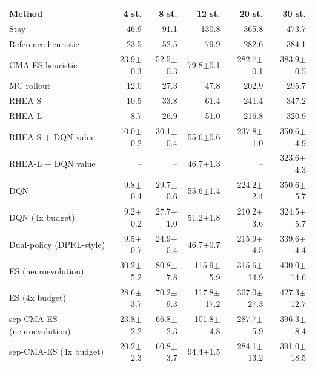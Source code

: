\begin{tabular}{lrrrrr}
\toprule
Method & 4 st. & 8 st. & 12 st. & 20 st. & 30 st. \\
\midrule
Stay & 46.9 & 91.1 & 130.8 & 365.8 & 473.7 \\
Reference heuristic & 23.5 & 52.5 & 79.9 & 282.6 & 384.1 \\
CMA-ES heuristic & 23.9$\pm$0.3 & 52.5$\pm$0.3 & 79.8$\pm$0.1 & 282.7$\pm$0.1 & 383.9$\pm$0.5 \\
MC rollout & 12.0 & 27.3 & 47.8 & 202.9 & 295.7 \\
RHEA-S & 10.5 & 33.8 & 61.4 & 241.4 & 347.2 \\
RHEA-L & 8.7 & 26.9 & 51.0 & 216.8 & 320.9 \\
RHEA-S + DQN value & 10.0$\pm$0.2 & 30.1$\pm$0.4 & 55.6$\pm$0.6 & 237.8$\pm$1.0 & 350.6$\pm$4.9 \\
RHEA-L + DQN value & -- & -- & 46.7$\pm$1.3 & -- & 323.6$\pm$4.3 \\
DQN & 9.8$\pm$0.4 & 29.7$\pm$0.6 & 55.6$\pm$1.4 & 224.2$\pm$2.4 & 350.6$\pm$5.7 \\
DQN (4x budget) & 9.2$\pm$0.2 & 27.7$\pm$1.0 & 51.2$\pm$1.8 & 210.2$\pm$3.6 & 324.5$\pm$5.7 \\
Dual-policy (DPRL-style) & 9.5$\pm$0.7 & 24.9$\pm$0.4 & 46.7$\pm$0.7 & 215.9$\pm$4.5 & 339.6$\pm$4.4 \\
ES (neuroevolution) & 30.2$\pm$5.2 & 80.8$\pm$7.8 & 115.9$\pm$5.9 & 315.6$\pm$14.9 & 430.0$\pm$14.6 \\
ES (4x budget) & 28.6$\pm$3.7 & 70.2$\pm$9.3 & 117.8$\pm$17.2 & 307.0$\pm$27.3 & 427.3$\pm$12.7 \\
sep-CMA-ES (neuroevolution) & 23.8$\pm$2.2 & 66.8$\pm$2.3 & 101.8$\pm$4.8 & 287.7$\pm$5.9 & 396.3$\pm$8.4 \\
sep-CMA-ES (4x budget) & 20.2$\pm$2.3 & 60.8$\pm$3.7 & 94.4$\pm$1.5 & 284.1$\pm$13.2 & 391.0$\pm$18.5 \\
\bottomrule
\end{tabular}
